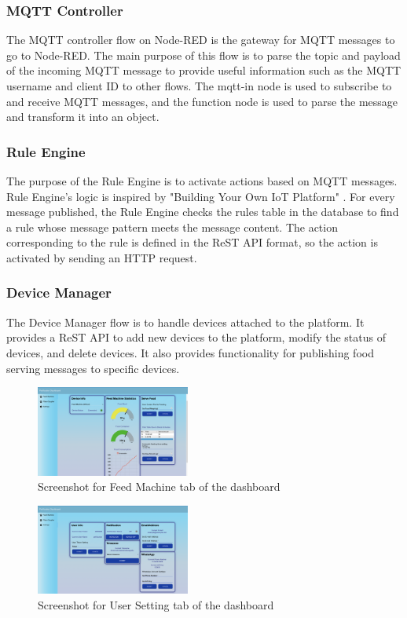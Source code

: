 \documentclass[conference]{IEEEtran}
\begin{document}
\subsubsection{MQTT Controller}
The MQTT controller flow on Node-RED is the gateway for MQTT messages to go to Node-RED.
The main purpose of this flow is to parse the topic and payload of the incoming MQTT message to provide useful information such as the MQTT username and client ID to other flows.
The mqtt-in node is used to subscribe to and receive MQTT messages, and the function node is used to parse the message and transform it into an object.

\subsubsection{Rule Engine}
The purpose of the Rule Engine is to activate actions based on MQTT messages.
Rule Engine's logic is inspired by "Building Your Own IoT Platform" \cite{b14}.
For every message published, the Rule Engine checks the rules table in the database to find a rule whose message pattern meets the message content.
The action corresponding to the rule is defined in the ReST API format, so the action is activated by sending an HTTP request.

\subsubsection{Device Manager}
The Device Manager flow is to handle devices attached to the platform.
It provides a ReST API to add new devices to the platform, modify the status of devices, and delete devices.
It also provides functionality for publishing food serving messages to specific devices.

\begin{figure}[htbp]
\centerline{\includegraphics[width=0.45\textwidth]{./images/feed_machine_ui.png}}
\caption{Screenshot for Feed Machine tab of the dashboard}
\label{fig13}
\end{figure}

\begin{figure}[htbp]
\centerline{\includegraphics[width=0.45\textwidth]{./images/user_settings_ui.png}}
\caption{Screenshot for User Setting tab of the dashboard}
\label{fig13a}
\end{figure}
\end{document}
